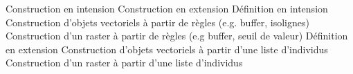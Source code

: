 
Construction en intension
Construction en extension
Définition en intension
Construction d’objets vectoriels à partir de règles (e.g. buffer, isolignes)
Construction d’un raster à partir de règles (e.g buffer, seuil de valeur)
Définition en extension
Construction d’objets vectoriels à partir d’une liste d’individus
Construction d’un raster à partir d’une liste d’individus
